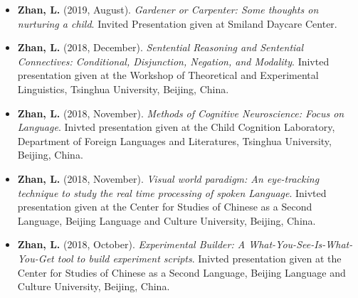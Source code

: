 \documentclass[12pt,]{article}
\begin{document}
\begin{itemize}
\item
  \textbf{Zhan, L.} (2019, August). \emph{Gardener or Carpenter: Some
  thoughts on nurturing a child}. Invited Presentation given at Smiland
  Daycare Center. \href{https://publications.likan.info/talks/parent/}{
  \faExternalLink* }
\item
  \textbf{Zhan, L.} (2018, December). \emph{Sentential Reasoning and
  Sentential Connectives: Conditional, Disjunction, Negation, and
  Modality}. Inivted presentation given at the Workshop of Theoretical
  and Experimental Linguistics, Tsinghua University, Beijing, China.
  \href{https://publications.likan.info/Talks/Sentential_Reasoning_Sentential_Connectives.pdf}{
  \faFilePdf[regular] }
\item
  \textbf{Zhan, L.} (2018, November). \emph{Methods of Cognitive
  Neuroscience: Focus on Language}. Inivted presentation given at the
  Child Cognition Laboratory, Department of Foreign Languages and
  Literatures, Tsinghua University, Beijing, China.
  \href{https://publications.likan.info/Talks/MethodsCognNeurosciLang2018NOV.pdf}{
  \faFilePdf[regular] }
\item
  \textbf{Zhan, L.} (2018, November). \emph{Visual world paradigm: An
  eye-tracking technique to study the real time processing of spoken
  Language}. Inivted presentation given at the Center for Studies of
  Chinese as a Second Language, Beijing Language and Culture University,
  Beijing, China.
  \href{https://publications.likan.info/Talks/Visual_World_Paradigm.pdf}{
  \faFilePdf[regular] }
\item
  \textbf{Zhan, L.} (2018, October). \emph{Experimental Builder: A
  What-You-See-Is-What-You-Get tool to build experiment scripts}.
  Inivted presentation given at the Center for Studies of Chinese as a
  Second Language, Beijing Language and Culture University, Beijing,
  China.
  \href{https://publications.likan.info/Eyelink_Experiment_Builder_Training_Materials/}{
  \faFilePdf[regular] }
\end{itemize}
\end{document}
